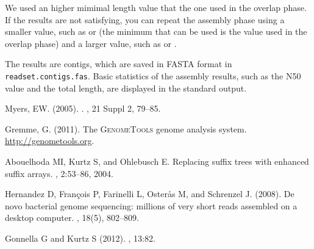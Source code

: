 \documentclass[12pt,titlepage]{article}
\begin{document}
We used an higher mimimal length value that the one used in the overlap phase.
If the results are not satisfying, you can repeat the assembly phase
using a smaller value, such as   or
  
(the minimum that can be used is the value used in the overlap phase)
and a larger value, such as   or
  .

The results are contigs, which are saved in FASTA format
in \texttt{readset.contigs.fas}.
Basic statistics of the assembly results, such as the N50 value
and the total length, are displayed in the standard output.

\begin{thebibliography}{1}

Myers, EW. (2005).
.
, {21 Suppl 2}, 79--85.

Gremme, G. (2011).
\newblock The \textsc{GenomeTools} genome analysis system.
  \url{http://genometools.org}.

Abouelhoda MI, Kurtz S, and Ohlebusch E.
\newblock Replacing suffix trees with enhanced suffix arrays.
, 2:53--86, 2004.

Hernandez D, François P, Farinelli L, Osterås M, and Schrenzel J.
  (2008).
\newblock De novo bacterial genome sequencing: millions of very short reads
  assembled on a desktop computer.
, {18}(5), 802--809.

Gonnella G and Kurtz S (2012).
, {13}:82.

\end{thebibliography}
\end{document}
